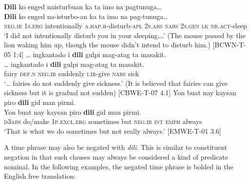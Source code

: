 \ea
\textbf{Dili}  ko  enged  naisturbuan  ka  ta  imo  na  pagtunuga… \\\smallskip
\gll \textbf{Dili}  ko  enged  na-isturbo-an  ka  ta  imo  na  pag-tunuga… \\
\textsc{neg.ir}  1\textsc{s.erg}  intentionally  \textsc{a.hap.r}-disturb-\textsc{apl}  2\textsc{s.abs}  \textsc{nabs}  2\textsc{s.gen}  \textsc{lk}  \textsc{nr.act}-sleep \\
\glt ‘I did not intentionally disturb you in your sleeping….’ (The mouse passed by the lion waking him  up, though the mouse didn't intend to disturb him.) [BCWN-T-05 1:4]
\z
\ea
… ingkantado  i  \textbf{dili}  gulpi  mag-atag  ta  masakit. \\\smallskip
\gll … ingkantado  i  \textbf{dili}  gulpi  mag-atag  ta  masakit. \\
{} fairy  \textsc{def.n}  \textsc{neg.ir}  suddenly  \textsc{i.ir}-give  \textsc{nabs}  sick \\
\glt ‘… fairies do not suddenly give sickness.’ (It is believed that fairies can give sickness but it is gradual not sudden) [CBWE-T-07 4.1]
\z
\ea
\label{bkm:Ref118463113}
Yon  buat  nay  kaysan  piro  \textbf{dili}  gid  man  pirmi. \\\smallskip
\gll Yon  buat  nay  kaysan  piro  \textbf{dili}  gid  man  pirmi. \\
\textsc{d}3\textsc{abs}  do/make  1\textsc{p.excl.erg}  sometimes  but  \textsc{neg.ir}  \textsc{int}  \textsc{emph}  always \\
\glt ‘That is what we do sometimes but not really always.’ [EMWE-T-01 3.6]
\z

A time phrase may also be negated with \textit{dili}. This is similar to constituent negation in that such clauses may always be considered a kind of predicate nominal. In the following examples, the negated time phrase is bolded in the English free translation:


